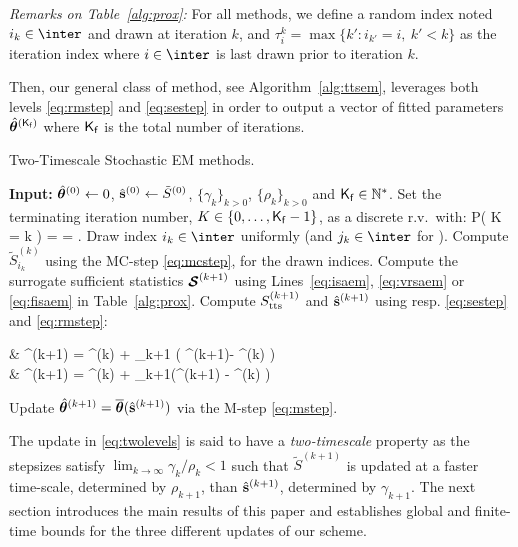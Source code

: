 \documentclass[journal, 11pt]{IEEEtran}
\begin{document}
\vspace{0.08in}
\noindent \emph{Remarks on Table~\ref{alg:prox}:} For all methods, we define a random index noted $i_k \in \inter$ and drawn at iteration $k$, and $\tau_i^k = \max \{ k' : i_{k'} = i,~k' < k \}$ as the iteration index where $i \in \inter$ is last drawn prior to iteration $k$.



Then, our general class of method, see Algorithm~\ref{alg:ttsem}, leverages both levels \eqref{eq:rmstep} and \eqref{eq:sestep} in order to output a vector of fitted parameters $\hat{{\bm{\theta}}}^{({\sf K}_{\sf f })}$ where ${\sf K}_{\sf f }$ is the total number of iterations.
\begin{algorithm}[H]
\caption{Two-Timescale Stochastic EM methods.}\label{alg:ttsem}
  \begin{algorithmic}[1]
  \STATE \textbf{Input:} $\hat{{\bm{\theta}}}^{(0)} \leftarrow 0$, $\hat{{\mathbf{s}}}^{(0)} \leftarrow \tilde{S}^{(0)}$, $\{\gamma_k\}_{k>0}$, $\{\rho_k\}_{k>0}$ and $ {\sf K}_{\sf f }\in \mathbb{N}^*$.
  \STATE Set the terminating iteration number, $K \in \{0,\dots,{\sf K}_{\sf f }-1\}$, as a discrete r.v.~with:
  \beq \label{eq:random}
   P( K = k ) =  = \eqs.
  \eeq
  \STATE Draw index $i_k \in \inter$ uniformly (and $j_k \in \inter$ for \FISAEM).
     \STATE Compute $\tilde{S}_{i_k}^{(k)}$ using the {\sf MC-step} \eqref{eq:mcstep},  for the drawn indices.
   \STATE Compute the surrogate sufficient statistics ${\bm{\mathcal{S}}}^{(k+1)}$ using Lines~\ref{eq:isaem}, \ref{eq:vrsaem} or \ref{eq:fisaem} in Table~\ref{alg:prox}.
   \STATE Compute $S_{\textrm{tts}}^{(k+1)}$ and $\hat{{\mathbf{s}}}^{(k+1)}$ using resp. \eqref{eq:sestep} and \eqref{eq:rmstep}:
\beq \label{eq:twolevels}
\begin{split}
& \stt^{(k+1)} = \stt^{(k)} + \rho_{k+1} \big( \StocEstep^{(k+1)}- \stt^{(k)}  \big)\\
&  \hat{\bss}^{(k+1)} =  \hat{\bss}^{(k)}  + \gamma_{k+1}(\stt^{(k+1)} - \hat{\bss}^{(k)} )
\end{split}
\eeq
   \STATE Update $\hat{{\bm{\theta}}}^{(k+1)} = \overline{{\bm{\theta}}}(  \hat{{\mathbf{s}}}^{(k+1)}) $ via the {\sf M-step} \eqref{eq:mstep}.
\ENDFOR
  \end{algorithmic}
\end{algorithm}
The update in \eqref{eq:twolevels} is said to have a \emph{two-timescale} property as the stepsizes satisfy $\lim_{k \to \infty} \gamma_k/\rho_k < 1$ such that $ \tilde{S}^{(k+1)} $  is updated at a faster time-scale, determined by $\rho_{k+1}$, than $\hat{{\mathbf{s}}}^{(k+1)}$, determined by $\gamma_{k+1}$.
The next section introduces the main results of this paper and establishes global and finite-time bounds for the three different updates of our scheme. 
\end{document}
